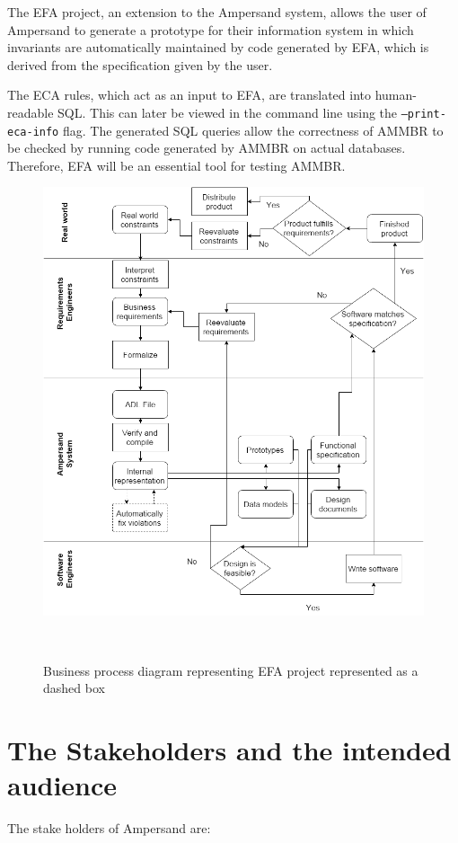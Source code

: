 The EFA project, an extension to the Ampersand system, allows 
the user of Ampersand to generate a prototype for their information
system in which invariants are automatically maintained by code 
generated by EFA, which is derived from the specification given by the user.

The ECA rules, which act as an input to EFA, are translated into human-readable
SQL. This can later be viewed in the command line using the
\texttt{--print-eca-info} flag.  The generated SQL queries allow the
correctness of AMMBR to be checked by running code generated by AMMBR on actual
databases. Therefore, EFA will be an essential tool for testing AMMBR.

\begin{figure}[!htb]
\begin{center}
\includegraphics[width=\textwidth]{../figures/business_process}
\caption{Business process diagram representing EFA project represented as a dashed box}~\label{fig:EFAproject}
\end{center}
\end{figure}

\section{The Stakeholders and the intended audience}\label{sec:Stakeholders}
The stake holders of Ampersand are:

